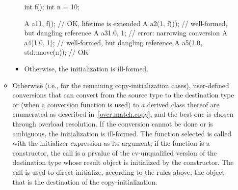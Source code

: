 \begin{itemize}
\begin{itemize}
\begin{itemize}
\begin{note}
\begin{example}
\begin{codeblock}
int f();
int n = 10;

A a1{1, f()};                   // OK, lifetime is extended
A a2(1, f());                   // well-formed, but dangling reference
A a3{1.0, 1};                   // error: narrowing conversion
A a4(1.0, 1);                   // well-formed, but dangling reference
A a5(1.0, std::move(n));        // OK
\end{codeblock}
\end{example}
\end{note}
\item
Otherwise, the initialization is ill-formed.
\end{itemize}

\item
Otherwise (i.e., for the remaining copy-initialization cases),
user-defined conversions that can convert from the
source type to the destination type or (when a conversion function
is used) to a derived class thereof are enumerated as described in~\ref{over.match.copy},
and the best one is chosen through overload resolution.
If the conversion cannot be done or
is ambiguous, the initialization is ill-formed.  The function
selected is called with the initializer expression as its
argument; if the function is a constructor, the call is a prvalue
of the cv-unqualified version of the
destination type whose result object is initialized by the constructor.
The call is used
to direct-initialize, according to the rules above, the object
that is the destination of the copy-initialization.
\end{itemize}


\end{itemize}
